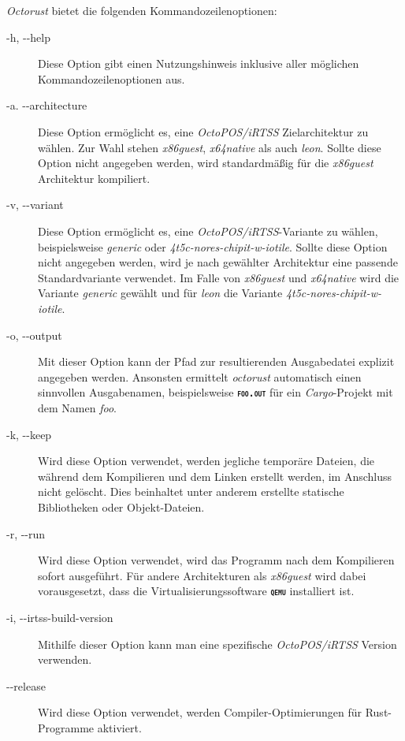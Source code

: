 \textit{Octorust} bietet die folgenden Kommandozeilenoptionen:
\begin{description}

	\item[-h, -{}-help]
	Diese Option gibt einen Nutzungshinweis inklusive aller möglichen Kommandozeilenoptionen aus.
	
	\item[-a. -{}-architecture]
	Diese Option ermöglicht es, eine \textit{OctoPOS/iRTSS} Zielarchitektur zu wählen. Zur Wahl stehen \textit{x86guest},
	\textit{x64native} als auch \textit{leon}.
	Sollte diese Option nicht angegeben werden, wird standardmäßig für die \textit{x86guest} Architektur kompiliert.
	
	\item[-v, -{}-variant]
	Diese Option ermöglicht es, eine \textit{OctoPOS/iRTSS}-Variante zu wählen,
	beispielsweise \textit{generic} oder \textit{4t5c-nores-chipit-w-iotile}.
	Sollte diese Option nicht angegeben werden, wird je nach gewählter Architektur
	eine passende Standardvariante verwendet.
	Im Falle von \textit{x86guest} und \textit{x64native} wird die Variante \textit{generic} gewählt und für 
	\textit{leon} die Variante \textit{4t5c-nores-chipit-w-iotile}.
	
	\item[-o, -{}-output]
	Mit dieser Option kann der Pfad zur resultierenden Ausgabedatei explizit angegeben	werden.
	Ansonsten ermittelt \textit{octorust} automatisch einen sinnvollen Ausgabenamen,
	beispielsweise \texttt{\textsc{\textbf{foo.out}}} für ein \textit{Cargo}-Projekt mit dem Namen
	\textit{foo}.
	
	\item[-k, -{}-keep]
	Wird diese Option verwendet, werden jegliche temporäre Dateien,
	die während dem Kompilieren und dem Linken erstellt werden, im
	Anschluss nicht gelöscht.
	Dies beinhaltet unter anderem erstellte statische Bibliotheken oder Objekt-Dateien.
	
	\item[-r, -{}-run]
	Wird diese Option verwendet, wird das Programm nach dem Kompilieren sofort ausgeführt.
	Für andere Architekturen als \textit{x86guest} wird dabei vorausgesetzt,
	dass die Virtualisierungssoftware \texttt{\textsc{\textbf{qemu}}} installiert ist.
	
	\item[-i, -{}-irtss-build-version]
	Mithilfe dieser Option kann man eine spezifische \textit{OctoPOS/iRTSS} Version verwenden.
	
	\item[-{}-release]
	Wird diese Option verwendet, werden Compiler-Optimierungen für Rust-Programme aktiviert.
	

\end{description}
